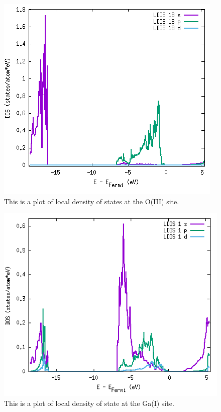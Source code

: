 \begin{figure}[H]
\includegraphics[width=0.94\linewidth]{../fig/dosplot/ldos_O_III_primitive}\caption{This is a plot of local density of states at the O(III) site.}\label{fig:ldos_O_III}
\end{figure}

\begin{figure}[H]
\includegraphics[width=0.97\linewidth]{../fig/dosplot/ldos_Ga_I_primitive}\caption{This is a plot of local density of state at the Ga(I) site.}\label{fig:ldos_Ga_I}
\end{figure}

